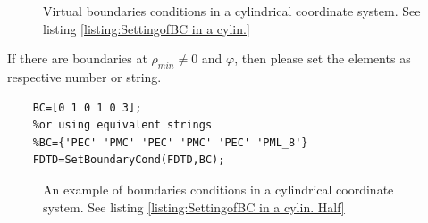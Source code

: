 \begin{itemize}
\begin{figure}[ht]
			  \caption[ Setting virtual boundaries conditions in a cylindrical coordinate system]{Virtual boundaries conditions in a cylindrical coordinate system. See listing \ref{listing:SettingofBC in a cylin.}}
			  \label{fig:Ex. SetBoundaryCond in cylin.}
		    \end{figure}
If there are boundaries at $\rho_{min}\neq0$ and $\varphi$, then please set the elements as respective number or string.
\begin{lstlisting}[caption={BC assignment in a cylindrical coordinate system as fig \ref{fig:Ex. SetBoundaryCond in cylin. Half}},label={listing:SettingofBC in a cylin. Half}]
	% no boundaries at rhomin=0 , phi_min and phi_max
	BC=[0 1 0 1 0 3];
	%or using equivalent strings
	%BC={'PEC' 'PMC' 'PEC' 'PMC' 'PEC' 'PML_8'} 
	FDTD=SetBoundaryCond(FDTD,BC); 
			\end{lstlisting} 
    \begin{figure}[H]
			  \centering
 \qquad
 \qquad 
			  \caption[ Setting  boundaries conditions in a cylindrical coordinate system]{An example of boundaries conditions in a cylindrical coordinate system. See listing \ref{listing:SettingofBC in a cylin. Half}}
			  \label{fig:Ex. SetBoundaryCond in cylin. Half}
		    \end{figure}
\end{itemize}
